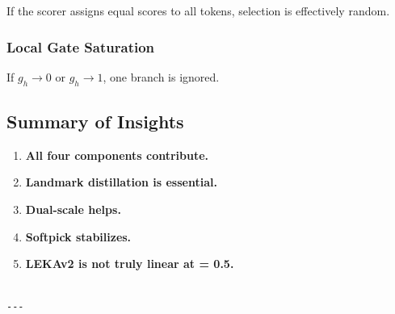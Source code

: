 If the scorer assigns equal scores to all tokens, selection is effectively 
random.

\subsubsection{Local Gate Saturation}

If $g_h \to 0$ or $g_h \to 1$, one branch is ignored.

\subsection{Summary of Insights}

\begin{enumerate}
\item \textbf{All four components contribute.}
\item \textbf{Landmark distillation is essential.}
\item \textbf{Dual-scale helps.}
\item \textbf{Softpick stabilizes.}
\item \textbf{LEKAv2 is not truly linear at   = 0.5.}
\end{enumerate}
\begin{lstlisting}

---
\end{lstlisting}